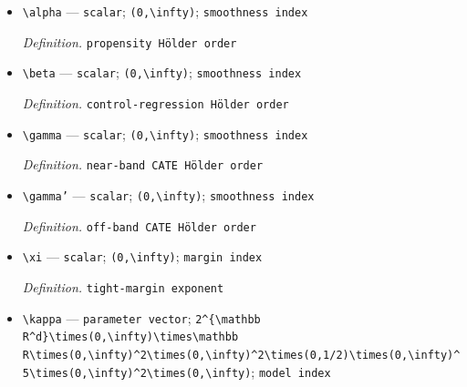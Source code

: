\documentclass{article}
\begin{document}
\begin{itemize}
  \par\smallskip\noindent\emph{Definition.} \texttt{CATE Hölder radius}
  \item \texttt{\textbackslash{}\allowbreak{}alpha} --- \texttt{scalar}; \texttt{(0,\allowbreak{}\textbackslash{}\allowbreak{}infty)}; \texttt{smoothness index}
  \par\smallskip\noindent\emph{Definition.} \texttt{propensity Hölder order}
  \item \texttt{\textbackslash{}\allowbreak{}beta} --- \texttt{scalar}; \texttt{(0,\allowbreak{}\textbackslash{}\allowbreak{}infty)}; \texttt{smoothness index}
  \par\smallskip\noindent\emph{Definition.} \texttt{control-\allowbreak{}regression Hölder order}
  \item \texttt{\textbackslash{}\allowbreak{}gamma} --- \texttt{scalar}; \texttt{(0,\allowbreak{}\textbackslash{}\allowbreak{}infty)}; \texttt{smoothness index}
  \par\smallskip\noindent\emph{Definition.} \texttt{near-\allowbreak{}band CATE Hölder order}
  \item \texttt{\textbackslash{}\allowbreak{}gamma'} --- \texttt{scalar}; \texttt{(0,\allowbreak{}\textbackslash{}\allowbreak{}infty)}; \texttt{smoothness index}
  \par\smallskip\noindent\emph{Definition.} \texttt{off-\allowbreak{}band CATE Hölder order}
  \item \texttt{\textbackslash{}\allowbreak{}xi} --- \texttt{scalar}; \texttt{(0,\allowbreak{}\textbackslash{}\allowbreak{}infty)}; \texttt{margin index}
  \par\smallskip\noindent\emph{Definition.} \texttt{tight-\allowbreak{}margin exponent}
  \item \texttt{\textbackslash{}\allowbreak{}kappa} --- \texttt{parameter vector}; \texttt{2\textasciicircum{}\{\textbackslash{}\allowbreak{}mathbb R\textasciicircum{}d\}\allowbreak{}\textbackslash{}\allowbreak{}times(0,\allowbreak{}\textbackslash{}\allowbreak{}infty)\textbackslash{}\allowbreak{}times\textbackslash{}\allowbreak{}mathbb R\textbackslash{}\allowbreak{}times(0,\allowbreak{}\textbackslash{}\allowbreak{}infty)\textasciicircum{}2\textbackslash{}\allowbreak{}times(0,\allowbreak{}\textbackslash{}\allowbreak{}infty)\textasciicircum{}2\textbackslash{}\allowbreak{}times(0,\allowbreak{}1/\allowbreak{}2)\textbackslash{}\allowbreak{}times(0,\allowbreak{}\textbackslash{}\allowbreak{}infty)\textasciicircum{}5\textbackslash{}\allowbreak{}times(0,\allowbreak{}\textbackslash{}\allowbreak{}infty)\textasciicircum{}2\textbackslash{}\allowbreak{}times(0,\allowbreak{}\textbackslash{}\allowbreak{}infty)}; \texttt{model index}

\end{itemize}
\end{document}
